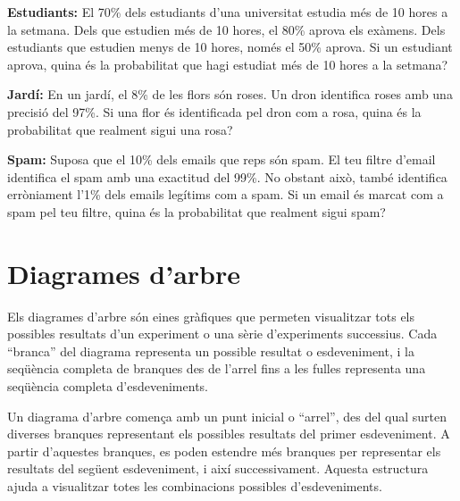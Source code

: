 \documentclass[12pt]{article}
\begin{document}
\begin{exercici} \noindent 
\textbf{Estudiants:} El 70\% dels estudiants d'una universitat estudia més de 10 hores a la setmana. Dels que estudien més de 10 hores, el 80\% aprova els exàmens. Dels estudiants que estudien menys de 10 hores, només el 50\% aprova. Si un estudiant aprova, quina és la probabilitat que hagi estudiat més de 10 hores a la setmana?
\end{exercici}

\begin{exercici} \noindent 
\textbf{Jardí:} En un jardí, el 8\% de les flors són roses. Un dron identifica roses amb una precisió del 97\%. Si una flor és identificada pel dron com a rosa, quina és la probabilitat que realment sigui una rosa?
\end{exercici}

\begin{exercici} \noindent 
\textbf{Spam:} Suposa que el 10\% dels emails que reps són spam. El teu filtre d'email identifica el spam amb una exactitud del 99\%. No obstant això, també identifica erròniament l'1\% dels emails legítims com a spam. Si un email és marcat com a spam pel teu filtre, quina és la probabilitat que realment sigui spam?
\end{exercici}

\newpage

\section{Diagrames d’arbre}

\begin{concept} [title=Introducció als diagrames d’arbre] \noindent Els diagrames d’arbre són eines gràfiques que permeten visualitzar tots els possibles resultats d'un experiment o una sèrie d'experiments successius. Cada “branca” del diagrama representa un possible resultat o esdeveniment, i la seqüència completa de branques des de l'arrel fins a les fulles representa una seqüència completa d'esdeveniments.

\end{concept}

\begin{concept} [title=Representació d’esdeveniments successius] \noindent Un diagrama d’arbre comença amb un punt inicial o “arrel”, des del qual surten diverses branques representant els possibles resultats del primer esdeveniment. A partir d’aquestes branques, es poden estendre més branques per representar els resultats del següent esdeveniment, i així successivament. Aquesta estructura ajuda a visualitzar totes les combinacions possibles d’esdeveniments.
\end{concept}
\end{document}
